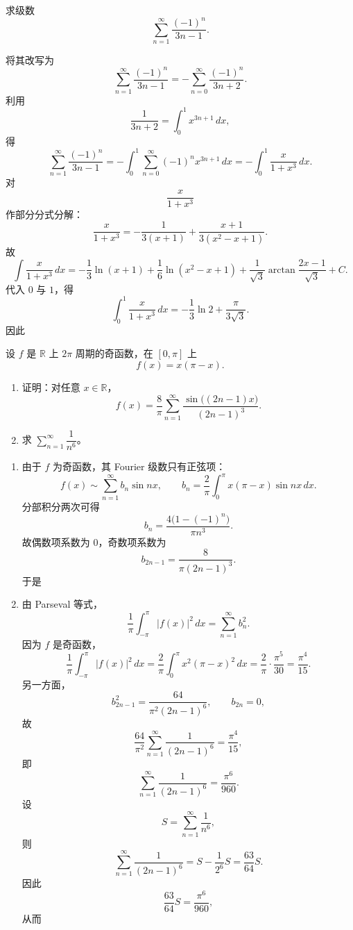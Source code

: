 \begin{question}[求和]

求级数
\[
\sum_{n=1}^{\infty}\frac{(-1)^n}{3n-1}.
\]

\begin{solution}
将其改写为
\[
\sum_{n=1}^{\infty}\frac{(-1)^n}{3n-1}
=-\sum_{n=0}^{\infty}\frac{(-1)^n}{3n+2}.
\]
利用
\[
\frac{1}{3n+2}=\int_0^1 x^{3n+1}\,dx,
\]
得
\[
\sum_{n=1}^{\infty}\frac{(-1)^n}{3n-1}
=-\int_0^1\sum_{n=0}^{\infty}(-1)^n x^{3n+1}\,dx
=-\int_0^1\frac{x}{1+x^3}\,dx.
\]
对
\[
\frac{x}{1+x^3}
\]
作部分分式分解：
\[
\frac{x}{1+x^3}
=-\frac{1}{3(x+1)}+\frac{x+1}{3(x^2-x+1)}.
\]
故
\[
\int \frac{x}{1+x^3}\,dx
=-\frac13\ln(x+1)+\frac16\ln(x^2-x+1)
+\frac{1}{\sqrt3}\arctan\frac{2x-1}{\sqrt3}+C.
\]
代入 $0$ 与 $1$，得
\[
\int_0^1\frac{x}{1+x^3}\,dx=-\frac13\ln2+\frac{\pi}{3\sqrt3}.
\]
因此
\end{solution}
\end{question}

\begin{question}

设 $f$ 是 $\mathbb R$ 上 $2\pi$ 周期的奇函数，在 $[0,\pi]$ 上
\[
f(x)=x(\pi-x).
\]
\begin{enumerate}[label=(\arabic*),leftmargin=2.6em,itemsep=0.25em,topsep=0.2em]
\item 证明：对任意 $x\in\mathbb R$，
\[
f(x)=\frac{8}{\pi}\sum_{n=1}^{\infty}\frac{\sin\bigl((2n-1)x\bigr)}{(2n-1)^3}.
\]
\item 求 $\sum_{n=1}^{\infty}\dfrac{1}{n^6}$。
\end{enumerate}

\begin{solution}
\begin{enumerate}[label=(\arabic*),leftmargin=2.6em,itemsep=0.25em,topsep=0.2em]
\item 由于 $f$ 为奇函数，其 Fourier 级数只有正弦项：
\[
f(x)\sim \sum_{n=1}^{\infty}b_n\sin nx,
\qquad
b_n=\frac{2}{\pi}\int_0^{\pi}x(\pi-x)\sin nx\,dx.
\]
分部积分两次可得
\[
b_n=\frac{4\bigl(1-(-1)^n\bigr)}{\pi n^3}.
\]
故偶数项系数为 $0$，奇数项系数为
\[
b_{2n-1}=\frac{8}{\pi(2n-1)^3}.
\]
于是

\item 由 Parseval 等式，
\[
\frac{1}{\pi}\int_{-\pi}^{\pi}|f(x)|^2\,dx=\sum_{n=1}^{\infty}b_n^2.
\]
因为 $f$ 是奇函数，
\[
\frac{1}{\pi}\int_{-\pi}^{\pi}|f(x)|^2\,dx
=\frac{2}{\pi}\int_0^{\pi}x^2(\pi-x)^2\,dx
=\frac{2}{\pi}\cdot \frac{\pi^5}{30}
=\frac{\pi^4}{15}.
\]
另一方面，
\[
b_{2n-1}^2=\frac{64}{\pi^2(2n-1)^6},
\qquad b_{2n}=0,
\]
故
\[
\frac{64}{\pi^2}\sum_{n=1}^{\infty}\frac{1}{(2n-1)^6}=\frac{\pi^4}{15},
\]
即
\[
\sum_{n=1}^{\infty}\frac{1}{(2n-1)^6}=\frac{\pi^6}{960}.
\]
设
\[
S=\sum_{n=1}^{\infty}\frac{1}{n^6},
\]
则
\[
\sum_{n=1}^{\infty}\frac{1}{(2n-1)^6}=S-\frac{1}{2^6}S=\frac{63}{64}S.
\]
因此
\[
\frac{63}{64}S=\frac{\pi^6}{960},
\]
从而
\end{enumerate}
\end{solution}
\end{question}

